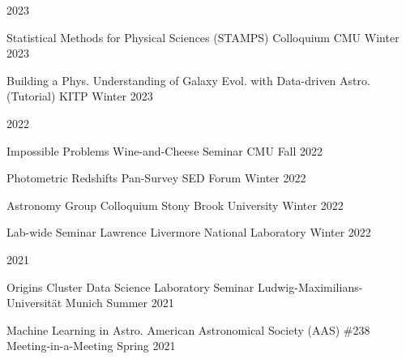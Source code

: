 \documentclass[11pt,letterpaper]{article}
\begin{document}
\nopagebreak\begin{list}{}{\malzlist}
	\item 2023
	\nopagebreak\begin{list}{}{\malzlist}
		\item {}
		{Statistical Methods for Physical Sciences (STAMPS) Colloquium}
		{CMU}
		{Winter 2023}
		\item {}
			{Building a Phys. Understanding of Galaxy Evol. with Data-driven Astro. (Tutorial)}
			{KITP}
			{Winter 2023}
	\end{list}
	\item 2022
	\nopagebreak\begin{list}{}{\malzlist}
		\item {}
			{Impossible Problems Wine-and-Cheese Seminar}
			{CMU}
			{Fall 2022}
		\item {}
			{Photometric Redshifts}
			{Pan-Survey SED Forum}
			{Winter 2022}
		\item {}
			{Astronomy Group Colloquium}
			{Stony Brook University}
			{Winter 2022}
		\item {}
			{Lab-wide Seminar}
			{Lawrence Livermore National Laboratory}
			{Winter 2022}
	\end{list}
	\item 2021
	\nopagebreak\begin{list}{}{\malzlist}
		\item {}
			{Origins Cluster Data Science Laboratory Seminar}
			{Ludwig-Maximilians-Universit{\"a}t Munich}%
			{Summer 2021}
		\item {}
			{Machine Learning in Astro.}%
			{American Astronomical Society (AAS) \#238 Meeting-in-a-Meeting}
			{Spring 2021}
		\item {}

\end{list}
\end{list}
\end{document}
